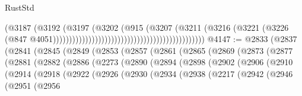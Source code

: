 \begin{lexlean}{RustStd}
\begin{coremodule}
                                                                            (@3187
                                                                              (@3192
                                                                                (@3197
                                                                                  (@3202
                                                                                    (@915
                                                                                      (@3207
                                                                                        (@3211
                                                                                          (@3216
                                                                                            (@3221
                                                                                              (@3226
                                                                                                (@847
                                                                                                  @4051)))))))))))))))))))))))))))))))))))))))))))))))
@4147 := @2833
    (@2837
      (@2841
        (@2845
          (@2849
            (@2853
              (@2857
                (@2861
                  (@2865
                    (@2869
                      (@2873
                        (@2877
                          (@2881
                            (@2882
                              (@2886
                                (@2273
                                  (@2890
                                    (@2894
                                      (@2898
                                        (@2902
                                          (@2906
                                            (@2910
                                              (@2914
                                                (@2918
                                                  (@2922
                                                    (@2926
                                                      (@2930
                                                        (@2934
                                                          (@2938
                                                            (@2217
                                                              (@2942
                                                                (@2946
                                                                  (@2951
                                                                    (@2956

\end{coremodule}
\end{lexlean}
